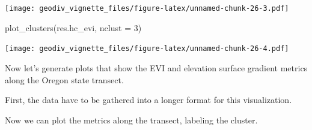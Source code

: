 \documentclass[
]{article}
\newenvironment{Shaded}{\begin{snugshade}}{\end{snugshade}}
\newcommand{\AttributeTok}[1]{\textcolor[rgb]{0.77,0.63,0.00}{#1}}
\newcommand{\CommentTok}[1]{\textcolor[rgb]{0.56,0.35,0.01}{\textit{#1}}}
\newcommand{\ControlFlowTok}[1]{\textcolor[rgb]{0.13,0.29,0.53}{\textbf{#1}}}
\newcommand{\DecValTok}[1]{\textcolor[rgb]{0.00,0.00,0.81}{#1}}
\newcommand{\FunctionTok}[1]{\textcolor[rgb]{0.00,0.00,0.00}{#1}}
\newcommand{\NormalTok}[1]{#1}
\newcommand{\OtherTok}[1]{\textcolor[rgb]{0.56,0.35,0.01}{#1}}
\newcommand{\SpecialCharTok}[1]{\textcolor[rgb]{0.00,0.00,0.00}{#1}}
\newcommand{\StringTok}[1]{\textcolor[rgb]{0.31,0.60,0.02}{#1}}
\begin{document}
\texttt{[image: geodiv\_vignette\_files/figure-latex/unnamed-chunk-26-3.pdf]}

\begin{Shaded}
\begin{Highlighting}[]
\FunctionTok{plot\_clusters}\NormalTok{(res.hc\_evi, }\AttributeTok{nclust =} \DecValTok{3}\NormalTok{)}
\end{Highlighting}
\end{Shaded}

\texttt{[image: geodiv\_vignette\_files/figure-latex/unnamed-chunk-26-4.pdf]}

Now let's generate plots that show the EVI and elevation surface
gradient metrics along the Oregon state transect.

First, the data have to be gathered into a longer format for this
visualization.

\begin{Shaded}
\end{Shaded}

Now we can plot the metrics along the transect, labeling the cluster.
\end{document}
